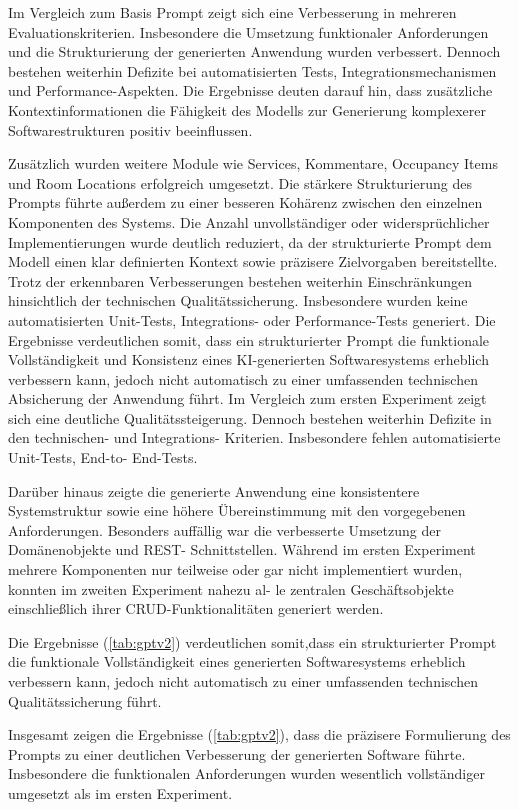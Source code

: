 \newpage
Im Vergleich zum Basis Prompt zeigt sich eine Verbesserung in mehreren Evaluationskriterien.
Insbesondere die Umsetzung funktionaler Anforderungen und
die Strukturierung der generierten Anwendung wurden verbessert.
Dennoch bestehen weiterhin Defizite bei automatisierten Tests, Integrationsmechanismen und Performance-Aspekten.
Die Ergebnisse deuten darauf hin, dass zusätzliche Kontextinformationen die Fähigkeit des Modells zur Generierung komplexerer Softwarestrukturen positiv beeinflussen.

Zusätzlich wurden weitere Module wie Services, Kommentare, Occupancy
Items und Room Locations erfolgreich umgesetzt.
Die stärkere Strukturierung des Prompts führte außerdem zu einer besseren Kohärenz
zwischen den einzelnen Komponenten des Systems. Die Anzahl unvollständiger
oder widersprüchlicher Implementierungen wurde deutlich reduziert, da der strukturierte
Prompt dem Modell einen klar definierten Kontext sowie präzisere Zielvorgaben bereitstellte.
Trotz der erkennbaren Verbesserungen bestehen weiterhin Einschränkungen hinsichtlich der technischen Qualitätssicherung. 
Insbesondere wurden keine automatisierten Unit-Tests, Integrations- oder Performance-Tests generiert.
Die Ergebnisse verdeutlichen somit, dass ein strukturierter Prompt die funktionale Vollständigkeit
und Konsistenz eines KI-generierten Softwaresystems erheblich verbessern kann,
jedoch nicht automatisch zu einer umfassenden technischen Absicherung der Anwendung führt.
Im Vergleich zum ersten Experiment zeigt sich eine deutliche Qualitätssteigerung.
Dennoch bestehen weiterhin Defizite in den technischen- und Integrations- Kriterien. Insbesondere fehlen automatisierte Unit-Tests, End-to-
End-Tests.

Darüber hinaus zeigte die generierte Anwendung eine konsistentere Systemstruktur
sowie eine höhere Übereinstimmung mit den vorgegebenen Anforderungen.
Besonders auffällig war die verbesserte Umsetzung der Domänenobjekte und REST-
Schnittstellen. Während im ersten Experiment mehrere Komponenten nur teilweise
oder gar nicht implementiert wurden, konnten im zweiten Experiment nahezu al-
le zentralen Geschäftsobjekte einschließlich ihrer CRUD-Funktionalitäten generiert
werden.

Die Ergebnisse (\ref{tab:gptv2}) verdeutlichen somit,dass ein strukturierter Prompt die funktionale Vollständigkeit eines generierten
Softwaresystems erheblich verbessern kann, jedoch nicht automatisch zu einer umfassenden technischen Qualitätssicherung führt.

Insgesamt zeigen die Ergebnisse (\ref{tab:gptv2}), dass die präzisere Formulierung des Prompts zu einer deutlichen
Verbesserung der generierten Software führte. Insbesondere die funktionalen
Anforderungen wurden wesentlich vollständiger umgesetzt als im ersten Experiment.